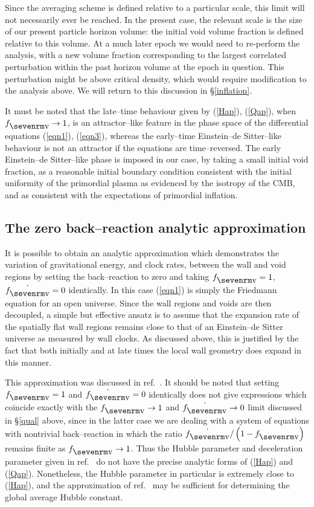 \documentclass[12pt]{article}
\begin{document}
Since the averaging scheme is defined
relative to a particular scale, this limit will not necessarily
ever be reached. In the present case, the relevant scale is the size
of our present particle horizon volume: the initial void volume fraction
is defined relative to this volume. At a much
later epoch we would need to re-perform the analysis, with a new volume
fraction corresponding to the largest correlated perturbation within the
past horizon volume at the epoch in question. This perturbation might be
above critical density, which would require modification to the analysis
above. We will return to this discussion in \S\ref{inflation}.

It must be noted that the late--time behaviour given by (\ref{Hap}),
(\ref{Qap}), when $\fv\to1$, is an attractor--like feature in the phase
space of the differential equations (\ref{eqn1}), (\ref{eqn3}), whereas
the early--time Einstein--de Sitter--like behaviour is not an attractor
if the equations are time--reversed. The early Einstein--de Sitter--like
phase is imposed in our case, by taking a small initial void fraction,
as a reasonable initial boundary condition consistent with the initial
uniformity of the primordial plasma as evidenced by the isotropy of the
CMB, and as consistent with the expectations of primordial inflation.

\subsection{The zero back--reaction analytic approximation\label{anap}}

It is possible to obtain an analytic approximation which demonstrates
the variation of gravitational energy, and clock rates, between the
wall and void regions by setting the back--reaction to zero and taking
$\fv=1$, $\dot\fv=0$ identically. In this case (\ref{eqn1}) is simply
the Friedmann equation for an open universe. Since the wall regions and
voids are then decoupled, a simple but effective ansatz is to assume
that the expansion rate of the spatially flat wall regions remains
close to that of an Einstein--de Sitter universe as measured by wall
clocks. As discussed above, this is justified by the fact that both
initially and at late times the local wall geometry does
expand in this manner.

This approximation was discussed in ref.\ \cite{paper0}. It should be noted
that setting $\fv=1$ and $\dot\fv=0$ identically does not give expressions
which coincide exactly with the $\fv\to1$ and $\dot\fv\to0$ limit discussed
in \S\ref{qual} above, since in the latter case we are dealing with
a system of equations with nontrivial back--reaction in which the ratio
$\dot\fv/\fvf$ remains finite as $\fv\to1$. Thus the Hubble parameter
and deceleration parameter given in ref.\ \cite{paper0} do not have
the precise analytic forms of (\ref{Hap}) and (\ref{Qap}). Nonetheless,
the Hubble parameter in particular is extremely close to (\ref{Hap}), and
the approximation of ref.\ \cite{paper0} may be sufficient for determining
the global average Hubble constant.
\end{document}
